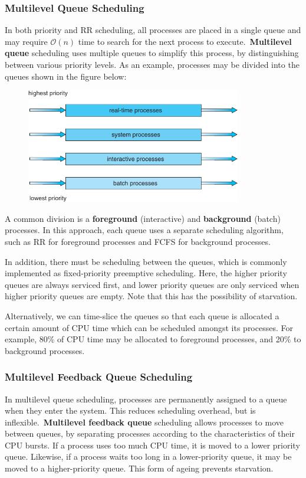 \documentclass{article}
\begin{document}
\subsubsection{Multilevel Queue Scheduling}
In both priority and RR scheduling, all processes are placed in a
single queue and may require \(\mathcal{O}\left( n \right)\) time to
search for the next process to execute.\ \textbf{Multilevel queue}
scheduling uses multiple queues to simplify this process, by
distinguishing between various priority levels. As an example,
processes may be divided into the queues shown in the figure below:
\begin{figure}[H]
    \centering
    \includegraphics[height = 5cm]{figures/multilevel_queue_scheduling.pdf}
\end{figure}
A common division is a \textbf{foreground} (interactive) and
\textbf{background} (batch) processes.
In this approach, each queue uses a separate scheduling algorithm, such
as RR for foreground processes and FCFS for background processes.

In addition, there must be scheduling between the queues, which is
commonly implemented as fixed-priority preemptive scheduling. Here, the
higher priority queues are always serviced first, and lower priority
queues are only serviced when higher priority queues are empty. Note
that this has the possibility of starvation.

Alternatively, we can time-slice the queues so that each queue is
allocated a certain amount of CPU time which can be scheduled amongst its
processes. For example, 80\% of CPU time may be allocated to foreground
processes, and 20\% to background processes.
\subsubsection{Multilevel Feedback Queue Scheduling}
In multilevel queue scheduling, processes are permanently assigned to a
queue when they enter the system. This reduces scheduling overhead, but
is inflexible.\ \textbf{Multilevel feedback queue} scheduling allows
processes to move between queues, by separating processes according to
the characteristics of their CPU bursts. If a process uses too much CPU
time, it is moved to a lower priority queue. Likewise, if a process
waits too long in a lower-priority queue, it may be moved to a
higher-priority queue. This form of ageing prevents starvation.
\end{document}
